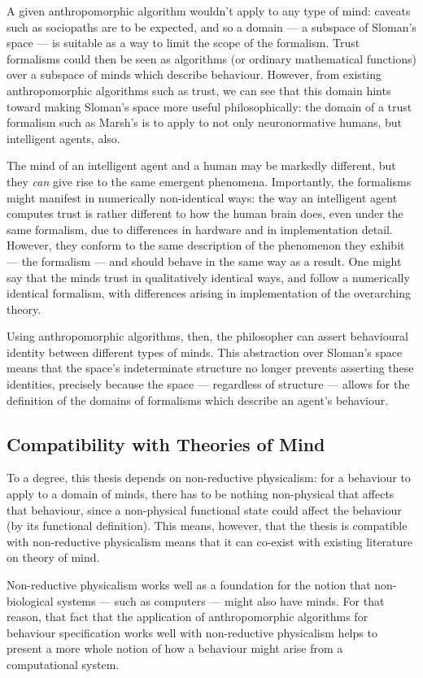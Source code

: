 A given anthropomorphic algorithm wouldn't apply to any type of mind: caveats such as sociopaths are to be expected, and so a domain --- a subspace of Sloman's space --- is suitable as a way to limit the scope of the formalism. Trust formalisms could then be seen as algorithms (or ordinary mathematical functions) over a subspace of minds which describe behaviour. However, from existing anthropomorphic algorithms such as trust, we can see that this domain hints toward making Sloman's space more useful philosophically: the domain of a trust formalism such as Marsh's is to apply to not only neuronormative humans, but intelligent agents, also.\par

The mind of an intelligent agent and a human may be markedly different, but they \emph{can} give rise to the same emergent phenomena. Importantly, the formalisms might manifest in numerically non-identical ways: the way an intelligent agent computes trust is rather different to how the human brain does, even under the same formalism, due to differences in hardware and in implementation detail. However, they conform to the same description of the phenomenon they exhibit --- the formalism --- and should behave in the same way as a result. One might say that the minds trust in qualitatively identical ways, and follow a numerically identical formalism, with differences arising in implementation of the overarching theory.\par

Using anthropomorphic algorithms, then, the philosopher can assert behavioural identity between different types of minds. This abstraction over Sloman's space means that the space's indeterminate structure no longer prevents asserting these identities, precisely because the space --- regardless of structure --- allows for the definition of the domains of formalisms which describe an agent's behaviour.\par

\subsection{Compatibility with Theories of Mind}
To a degree, this thesis depends on non-reductive physicalism: for a behaviour to apply to a domain of minds, there has to be nothing non-physical that affects that behaviour, since a non-physical functional state could affect the behaviour (by its functional definition). This means, however, that the thesis is compatible with non-reductive physicalism means that it can co-exist with existing literature on theory of mind.\par

Non-reductive physicalism works well as a foundation for the notion that non-biological systems --- such as computers --- might also have minds. For that reason, that fact that the application of anthropomorphic algorithms for behaviour specification works well with non-reductive physicalism helps to present a more whole notion of how a behaviour might arise from a computational system.\par

